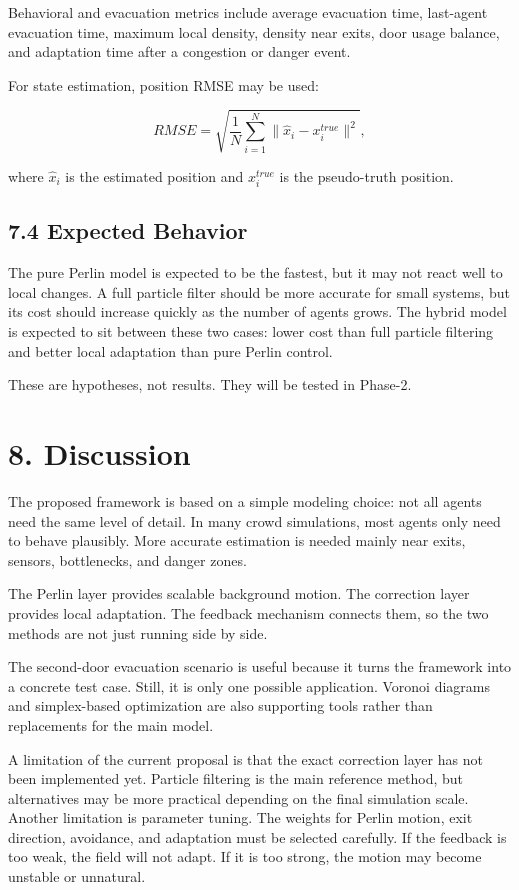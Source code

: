 \documentclass[
  11pt,
]{article}
\begin{document}
Behavioral and evacuation metrics include average evacuation time,
last-agent evacuation time, maximum local density, density near exits,
door usage balance, and adaptation time after a congestion or danger
event.

For state estimation, position RMSE may be used:

\[
RMSE
=
\sqrt{
\frac{1}{N}
\sum_{i=1}^N
\|\hat{x}_i - x_i^{true}\|^2
},
\]

where \(\hat{x}_i\) is the estimated position and \(x_i^{true}\) is the
pseudo-truth position.

\subsection{7.4 Expected Behavior}\label{expected-behavior}

The pure Perlin model is expected to be the fastest, but it may not
react well to local changes. A full particle filter should be more
accurate for small systems, but its cost should increase quickly as the
number of agents grows. The hybrid model is expected to sit between
these two cases: lower cost than full particle filtering and better
local adaptation than pure Perlin control.

These are hypotheses, not results. They will be tested in Phase-2.

\section{8. Discussion}\label{discussion}

The proposed framework is based on a simple modeling choice: not all
agents need the same level of detail. In many crowd simulations, most
agents only need to behave plausibly. More accurate estimation is needed
mainly near exits, sensors, bottlenecks, and danger zones.

The Perlin layer provides scalable background motion. The correction
layer provides local adaptation. The feedback mechanism connects them,
so the two methods are not just running side by side.

The second-door evacuation scenario is useful because it turns the
framework into a concrete test case. Still, it is only one possible
application. Voronoi diagrams and simplex-based optimization are also
supporting tools rather than replacements for the main model.

A limitation of the current proposal is that the exact correction layer
has not been implemented yet. Particle filtering is the main reference
method, but alternatives may be more practical depending on the final
simulation scale. Another limitation is parameter tuning. The weights
for Perlin motion, exit direction, avoidance, and adaptation must be
selected carefully. If the feedback is too weak, the field will not
adapt. If it is too strong, the motion may become unstable or unnatural.
\end{document}
